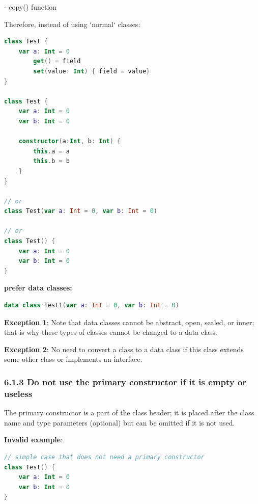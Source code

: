 {{{{- copy() function



Therefore, instead of using `normal` classes:



\begin{lstlisting}[language=Kotlin]
class Test {
    var a: Int = 0
        get() = field
        set(value: Int) { field = value}
}

class Test {
    var a: Int = 0
    var b: Int = 0
    
    constructor(a:Int, b: Int) {
        this.a = a
        this.b = b
    }
}

// or
class Test(var a: Int = 0, var b: Int = 0)
 
// or
class Test() {
    var a: Int = 0
    var b: Int = 0
}
\end{lstlisting}


\textbf{prefer data classes:}

\begin{lstlisting}[language=Kotlin]
data class Test1(var a: Int = 0, var b: Int = 0)
\end{lstlisting}


\textbf{Exception 1}: Note that data classes cannot be abstract, open, sealed, or inner; that is why these types of classes cannot be changed to a data class.



\textbf{Exception 2}: No need to convert a class to a data class if this class extends some other class or implements an interface.



\subsubsection*{\textbf{6.1.3 Do not use the primary constructor if it is empty or useless}}
\leavevmode\newline

\label{sec:6.1.3}

The primary constructor is a part of the class header; it is placed after the class name and type parameters (optional) but can be omitted if it is not used.



\textbf{Invalid example}:

\begin{lstlisting}[language=Kotlin]
// simple case that does not need a primary constructor
class Test() {
    var a: Int = 0
    var b: Int = 0
}


\end{lstlisting}}}}}
